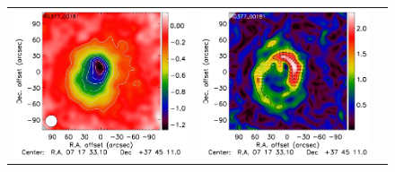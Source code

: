 \documentclass[traditabstract]{aa}
\begin{document}
\begin{figure}[h]
{\begin{tabular}{lll}
\includegraphics[trim=0cm 2.2cm 0cm 0cm, clip=true, scale=1]{Figure/Map_RG377_00181_Ymap_zobs0p5_processed.pdf} & 
\includegraphics[trim=2.3cm 2.2cm 0cm 0cm, clip=true, scale=1]{Figure/Grad_RG377_00181_Ymap_zobs0p5_processed_15_15_45.pdf} & 

\end{tabular}}
\end{figure}
\end{document}

